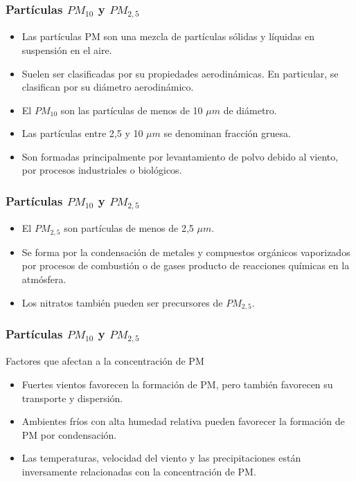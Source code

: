 \documentclass[12pt]{beamer}
\begin{document}
\begin{frame}
\frametitle{Partículas $PM_{10}$ y $PM_{2,5}$}
\begin{itemize}
\item<1-> Las partículas PM son una mezcla de partículas sólidas y líquidas en suspensión en el aire.
\item<2-> Suelen ser clasificadas por su propiedades aerodinámicas. En particular, se clasifican por su diámetro aerodinámico.
\item<3-> El $PM_{10}$ son las partículas de menos de 10 $\mu m$ de diámetro.
\item<4-> Las partículas entre 2,5 y 10 $\mu m$ se denominan fracción gruesa.
\item<5-> Son formadas principalmente por levantamiento de polvo debido al viento, por procesos industriales o biológicos.
\end{itemize}
\end{frame}

\begin{frame}
\frametitle{Partículas $PM_{10}$ y $PM_{2,5}$}
\begin{itemize}
\item<1-> El $PM_{2,5}$ son partículas de menos de 2,5 $\mu m$.
\item<2-> Se forma por la condensación de metales y compuestos orgánicos vaporizados por procesos de combustión o de gases producto de reacciones químicas en la atmósfera.
\item<3-> Los nitratos también pueden ser precursores de $PM_{2,5}$.
\end{itemize}
\end{frame}

\begin{frame}
\frametitle{Partículas $PM_{10}$ y $PM_{2,5}$}
\begin{block}{Factores que afectan a la concentración de PM}
\begin{itemize}
\item<1-> Fuertes vientos favorecen la formación de PM, pero también favorecen su transporte y dispersión.
\item<2-> Ambientes fríos con alta humedad relativa pueden favorecer la formación de PM por condensación.
\item<3-> Las temperaturas, velocidad del viento y las precipitaciones están inversamente relacionadas con la concentración de PM.
\end{itemize}
\end{block}
\end{frame}
\end{document}
